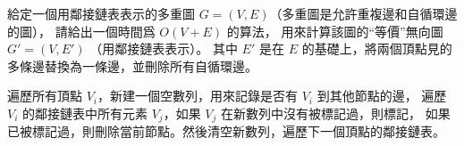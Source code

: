 \startEXERCISE
給定一個用鄰接鏈表表示的多重圖 $G=(V,E)$（多重圖是允許重複邊和自循環邊的圖），
請給出一個時間爲 $O(V+E)$ 的算法，
用來計算該圖的“等價”無向圖 $G'=(V,E')$ （用鄰接鏈表表示）。
其中 $E'$ 是在 $E$ 的基礎上，將兩個頂點見的多條邊替換為一條邊，並刪除所有自循環邊。
\stopEXERCISE

\startANSWER
遍歷所有頂點 $V_i$，新建一個空數列，用來記錄是否有 $V_i$ 到其他節點的邊，
遍歷 $V_i$ 的鄰接鏈表中所有元素 $V_j$，如果 $V_j$ 在新數列中沒有被標記過，則標記，
如果已被標記過，則刪除當前節點。然後清空新數列，遍歷下一個頂點的鄰接鏈表。
\stopANSWER
